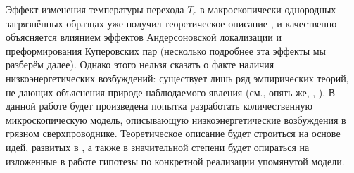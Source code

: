 Эффект изменения температуры перехода $T_c$ в макроскопически однородных загрязнённых образцах уже получил теоретическое описание \cite{Feigelman2010}, и качественно объясняется влиянием эффектов Андерсоновской локализации и преформирования Куперовских пар (несколько подробнее эта эффекты мы разберём далее). Однако этого нельзя сказать о факте наличия низкоэнергетических возбуждений: существует лишь ряд эмпирических теорий, не дающих объяснения природе наблюдаемого явления (см., опять же, \cite{Cheng_2016}, \cite{Sherman_2015}). В данной работе будет произведена попытка разработать количественную микроскопическую модель, описывающую низкоэнергетические возбуждения в грязном сверхпроводнике. Теоретическое описание будет строиться на основе идей, развитых в \cite{Feigelman2010}, а также в значительной степени будет опираться на изложенные в работе \cite{FI_microwave} гипотезы по конкретной реализации упомянутой модели.



